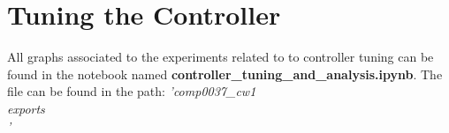 \documentclass[a4paper,12pt]{article}
\begin{document}
	\section{Tuning the Controller}
	\label{appendix:Controller-tuning}
	All graphs associated to the experiments related to to controller tuning can be found in the notebook named \textbf{controller\_tuning\_and\_analysis.ipynb}. The file can be found in the path: \textit{'comp0037\_cw1\\exports\\'}
	

	
\end{document}
